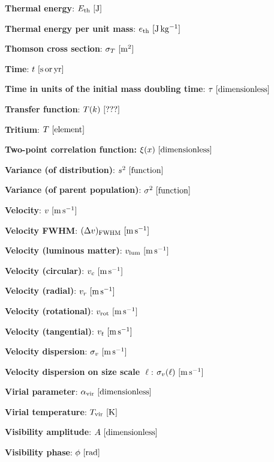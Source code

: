 \documentclass[a4paper,10pt]{article}
\begin{document}
{\noindent}\textbf{Thermal energy}: $E_\mathrm{th} ~ [{\rm J}]$

{\noindent}\textbf{Thermal energy per unit mass}: $e_\mathrm{th} ~ [{\rm J\,kg^{-1}}]$

{\noindent}\textbf{Thomson cross section}: $\sigma_T ~ [{\rm m^2}]$

{\noindent}\textbf{Time}: $t ~ [{\rm s\,or\,yr}]$

{\noindent}\textbf{Time in units of the initial mass doubling time}: $\tau ~ [{\rm dimensionless}]$

{\noindent}\textbf{Transfer function}: $T(k) ~ [{\rm ???}]$

{\noindent}\textbf{Tritium}: $T ~ [{\rm element}]$

{\noindent}\textbf{Two-point correlation function:} $\xi(x) ~ [{\rm dimensionless}]$

{\noindent}\textbf{Variance (of distribution)}: $s^2 ~ [{\rm function}]$

{\noindent}\textbf{Variance (of parent population)}: $\sigma^2 ~ [{\rm function}]$

{\noindent}\textbf{Velocity}: $v ~ [{\rm m\,s^{-1}}]$

{\noindent}\textbf{Velocity FWHM}: $(\Delta v)_{\rm FWHM} ~ [{\rm m\,s^{-1}}]$

{\noindent}\textbf{Velocity (luminous matter)}: $v_{\rm lum} ~ [{\rm m\,s^{-1}}]$

{\noindent}\textbf{Velocity (circular)}: $v_c ~ [{\rm m\,s^{-1}}]$

{\noindent}\textbf{Velocity (radial)}: $v_r ~ [{\rm m\,s^{-1}}]$

{\noindent}\textbf{Velocity (rotational)}: $v_\mathrm{rot} ~ [{\rm m\,s^{-1}}]$

{\noindent}\textbf{Velocity (tangential)}: $v_t ~ [{\rm m\,s^{-1}}]$

{\noindent}\textbf{Velocity dispersion}: $\sigma_v ~ [{\rm m\,s^{-1}}]$

{\noindent}\textbf{Velocity dispersion on size scale $\ell$}: $\sigma_v(\ell) ~ [{\rm m\,s^{-1}}]$

{\noindent}\textbf{Virial parameter}: $\alpha_\mathrm{vir} ~ [{\rm dimensionless}]$

{\noindent}\textbf{Virial temperature}: $T_\mathrm{vir} ~
[{\rm K}]$

{\noindent}\textbf{Visibility amplitude}: $A ~ [{\rm dimensionless}]$

{\noindent}\textbf{Visibility phase}: $\phi ~ [{\rm rad}]$
\end{document}
